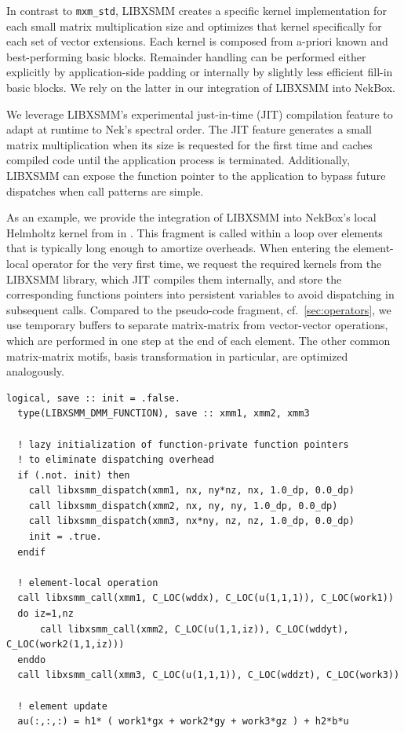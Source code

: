 In contrast to \texttt{mxm\_std}, LIBXSMM creates a specific kernel implementation for each small matrix multiplication size and optimizes that kernel specifically for each set of vector extensions.
Each kernel is composed from a-priori known and best-performing basic blocks.  
Remainder handling can be performed either explicitly by application-side padding or internally by slightly less efficient fill-in basic blocks. 
We rely on the latter in our integration of LIBXSMM into NekBox. 

We leverage LIBXSMM's experimental just-in-time (JIT) compilation feature to adapt at runtime to Nek's spectral order. 
The JIT feature generates a small matrix multiplication when its size is requested for the first time and caches compiled code until the application process is terminated. 
Additionally, LIBXSMM can expose the function pointer to the application to bypass future dispatches when call patterns are simple. 

As an example, we provide the integration of LIBXSMM into NekBox's local Helmholtz kernel from  in .
This fragment is called within a loop over elements that is typically long enough to amortize overheads. 
When entering the element-local operator for the very first time, we request the required kernels from the LIBXSMM library, which JIT compiles them internally, and store the corresponding functions pointers into persistent variables to avoid dispatching in subsequent calls. 
Compared to the pseudo-code fragment, cf.~\ref{sec:operators}, we use temporary buffers to separate matrix-matrix from vector-vector operations, which are performed in one step at the end of each element.
The other common matrix-matrix motifs, basis transformation in particular, are optimized analogously. 

\begin{lstlisting}[float,
  caption={Integration of LIBXSMM into NekBox's element-local Helmholtz operator. \texttt{xmm1, xmm2, xmm3} are persistent
  functions pointers to amortize LIBXSMM's dispatching overhead. The \texttt{libxsmm\_dispatch} call JITs the requested kernel and 
  populates the persistent function pointers.},
  label=lst:int_axhm]
  logical, save :: init = .false.
  type(LIBXSMM_DMM_FUNCTION), save :: xmm1, xmm2, xmm3

  ! lazy initialization of function-private function pointers
  ! to eliminate dispatching overhead
  if (.not. init) then
    call libxsmm_dispatch(xmm1, nx, ny*nz, nx, 1.0_dp, 0.0_dp)
    call libxsmm_dispatch(xmm2, nx, ny, ny, 1.0_dp, 0.0_dp)
    call libxsmm_dispatch(xmm3, nx*ny, nz, nz, 1.0_dp, 0.0_dp)
    init = .true.
  endif

  ! element-local operation
  call libxsmm_call(xmm1, C_LOC(wddx), C_LOC(u(1,1,1)), C_LOC(work1))
  do iz=1,nz
      call libxsmm_call(xmm2, C_LOC(u(1,1,iz)), C_LOC(wddyt), C_LOC(work2(1,1,iz)))
  enddo
  call libxsmm_call(xmm3, C_LOC(u(1,1,1)), C_LOC(wddzt), C_LOC(work3))

  ! element update
  au(:,:,:) = h1* ( work1*gx + work2*gy + work3*gz ) + h2*b*u
\end{lstlisting}

